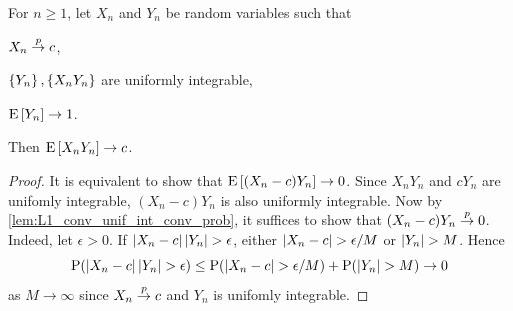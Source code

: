 \begin{lemma}\label{lem:unif_int_prod_conv}
    For $n\geq 1$, let $X_n$ and $Y_n$ be random variables such that 
    \begin{thmenum}
        \item $X_n\overset{p}{\to} c$, 
        \item $\left\{ {Y_n} \right\},\left\{ {X_nY_n} \right\}$ are uniformly integrable, 
        \item $\operatorname{E}\left[ {Y_n} \right]\to 1$. 
    \end{thmenum}
    Then $\operatorname{E}\left[ {X_nY_n} \right]\to c$. 
\end{lemma}
\begin{proof}
    It is equivalent to show that $\operatorname{E}\left[ {(X_n-c)Y_n} \right]\to 0$. Since 
    $X_nY_n$ and $cY_n$ are unifomly integrable, $(X_n-c)Y_n$ is 
    also uniformly integrable. Now by \cref{lem:L1_conv_unif_int_conv_prob}, 
    it suffices to show that $(X_n-c)Y_n\overset{p}{\to} 0$. Indeed, let $\epsilon>0$. 
    If $\left\lvert {X_n-c} \right\rvert\left\lvert {Y_n} \right\rvert>\epsilon$, either $\left\lvert {X_n-c} \right\rvert>\epsilon/M$ 
    or $\left\lvert {Y_n} \right\rvert>M$. Hence 
    \begin{equation*}
        \operatorname{P}(\left\lvert {X_n-c} \right\rvert\left\lvert {Y_n} \right\rvert>\epsilon)\leq \operatorname{P}(\left\lvert {X_n-c} \right\rvert>\epsilon/M) + \operatorname{P}(\left\lvert {Y_n} \right\rvert>M)
        \to 0
    \end{equation*}
    as $M\to\infty$ since $X_n\overset{p}{\to} c$ and $Y_n$ is unifomly integrable. 
\end{proof}

